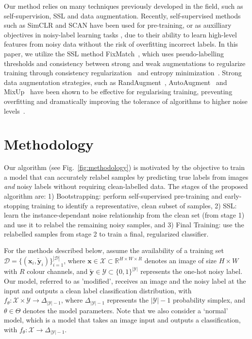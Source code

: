 \documentclass[10pt,twocolumn,letterpaper]{article}
\begin{document}
Our method relies on many techniques previously developed in the field, such as self-supervision, SSL and data augmentation. Recently, self-supervised methods such as SimCLR \cite{chen2020simple, chen2020big} and SCAN \cite{van2020scan} have been used for pre-training, or as auxilliary objectives in noisy-label learning tasks \cite{zheltonozhskii2022contrast, sachdeva2021scanmix}, due to their ability to learn high-level features from noisy data without the risk of overfitting incorrect labels. 
In this paper, we utilize the SSL method FixMatch~\cite{sohn2020fixmatch}, which uses pseudo-labelling thresholds and consistency between strong and weak augmentations to regularize training through consistency regularization~\cite{bachman2014learning, tarvainen2017mean, Laine2017TemporalEF} and entropy minimization~\cite{grandvalet2004semi, lee2013pseudo}.
Strong data augmentation strategies, such as RandAugment~\cite{cubuk2020randaugment}, AutoAugment~\cite{cubuk2019autoaugment} and MixUp~\cite{zhang2018mixup} have been shown to be effective for regularising training, preventing overfitting and dramatically improving the tolerance of algorithms to higher noise levels~\cite{Nishi_2021_CVPR, li2020dividemix, arazo2019unsupervised}.



\section{Methodology}
\label{sec:methodology}

Our algorithm (see Fig.~\ref{fig:methodology}) is motivated by the objective to train a model that can accurately relabel samples by predicting true labels from images \textit{and} noisy labels without requiring clean-labelled data. The stages of the proposed algorithm are: 1) Bootstrapping: perform self-supervised pre-training and early-stopping training to identify a representative, clean subset of samples, 2) SSL: learn the instance-dependant noise relationship from the clean set (from stage 1) and use it to relabel the remaining noisy samples, and 3) Final Training: use the relabelled samples from stage 2 to train a final, regularized classifier.

For the methods described below, assume the availability of a training set $\mathcal{D}=\{(\mathbf{x}_i,\tilde{\mathbf{y}}_i)\}_{i=1}^{|\mathcal{D}|}$, where $\mathbf{x} \in \mathcal{X} \subset \mathbb{R}^{H \times W \times R}$ denotes an image of size $H \times W$ with $R$ colour channels, and $\tilde{\mathbf{y}} \in \mathcal{Y} \subset \{0,1\}^{|\mathcal{Y}|}$ represents the one-hot noisy label.
Our model, referred to as 'modified', receives an image and the noisy label at the input and outputs a clean label classification distribution, with $f_\theta:\mathcal{X} \times \mathcal{Y} \to \Delta_{|\mathcal{Y}|-1}$, where $\Delta_{|\mathcal{Y}|-1}$ represents the $|\mathcal{Y}|-1$ probability simplex, and $\theta \in \Theta$ denotes the model parameters. Note that we also consider a `normal' model, which is a model that takes an image input and outputs a classification, with $f_\theta:\mathcal{X} \to \Delta_{|\mathcal{Y}|-1}$.
\end{document}
